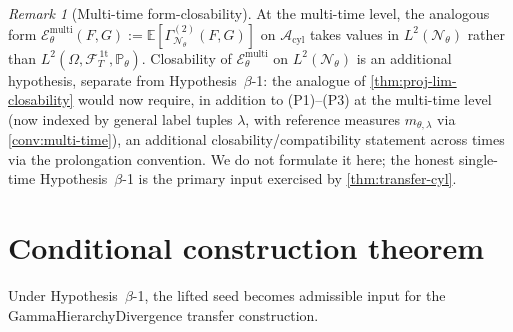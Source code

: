 \documentclass[11pt,reqno]{amsart}
\theoremstyle{plain}
\theoremstyle{definition}
\theoremstyle{remark}
\newtheorem{remark}[theorem]{Remark}
\newcommand{\E}{\mathbb E}
\newcommand{\Prob}{\mathbb P}
\newcommand{\cA}{\mathcal A}
\newcommand{\cE}{\mathcal E}
\newcommand{\cF}{\mathcal F}
\newcommand{\cN}{\mathcal N}
\newcommand{\Acyl}{\cA_{\mathrm{cyl}}}
\newcommand{\FT}{\cF_{T}^{\,\mathrm{1t}}}
\newcommand{\Hone}{L^{2}(\Omega,\FT,\Pth)}
\newcommand{\GamN}{\Gamma^{(2)}_{\cN_{\theta}}}
\newcommand{\Pth}{\Prob_{\theta}}
\begin{document}
\begin{remark}[Multi-time form-closability]\label{rem:multi-time-formclos}
At the multi-time level, the analogous form
$\cE_{\theta}^{\mathrm{multi}}(F,G):=\E[\GamN(F,G)]$ on $\Acyl$ takes
values in $L^{2}(\cN_{\theta})$ rather than $\Hone$. Closability
of $\cE_{\theta}^{\mathrm{multi}}$ on $L^{2}(\cN_{\theta})$ is an
additional hypothesis, separate from Hypothesis~$\beta$-1: the
analogue of \cref{thm:proj-lim-closability} would now require, in
addition to (P1)--(P3) at the multi-time level (now indexed by
general label tuples $\lambda$, with reference measures
$m_{\theta,\lambda}$ via \cref{conv:multi-time}), an additional
closability/compatibility statement across times via the
prolongation convention. We do not formulate it here; the honest
single-time Hypothesis~$\beta$-1 is the primary input exercised by
\cref{thm:transfer-cyl}.
\end{remark}

\section{Conditional construction theorem}\label{sec:transfer}

Under Hypothesis~$\beta$-1, the lifted seed becomes admissible input
for the GammaHierarchyDivergence transfer construction.
\end{document}

